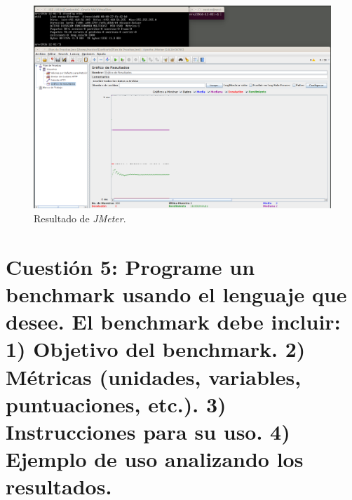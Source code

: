 \documentclass[a4paper,titlepage,12pt]{scrartcl}	%
\numberwithin{figure}{section} %
\numberwithin{table}{section} %
\begin{document}
	\begin{figure}[H]
		\includegraphics[width=\linewidth]{./Imagenes/4-resultado.png}
		\vspace{-0.5cm}
		\caption[Resultado de \textit{JMeter}.]{Resultado de \textit{JMeter}.}
		\label{4-resultado}
	\end{figure}
	
	\section[Cuestión 5: Programe un benchmark usando el lenguaje que desee. El	benchmark debe incluir: 1) Objetivo del benchmark. 2) Métricas (unidades, variables, puntuaciones, etc.). 3) Instrucciones para su uso. 4) Ejemplo de uso analizando los resultados.]{Cuestión 5: Programe un benchmark usando el lenguaje que desee. El	benchmark debe incluir: 1) Objetivo del benchmark. 2) Métricas (unidades, variables, puntuaciones, etc.). 3) Instrucciones para su uso. 4) Ejemplo de uso analizando los resultados.}
	
\end{document}
